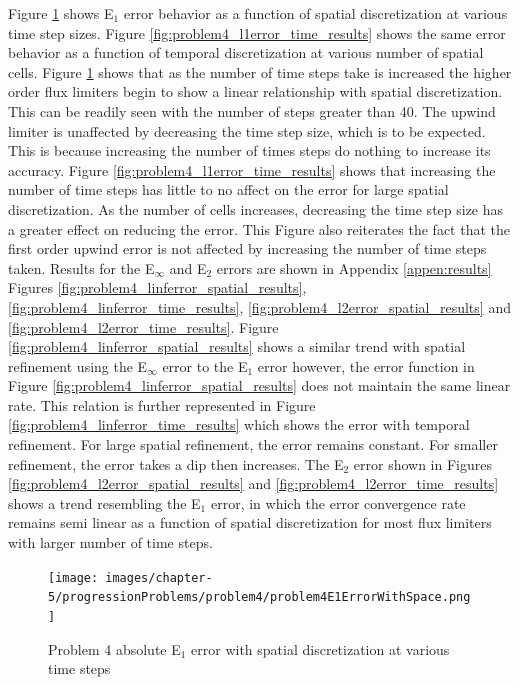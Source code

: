 Figure \ref{fig:problem4_l1error_spatial_results} shows E${}_{1}$ error behavior as a function of spatial discretization at various time step sizes. Figure \ref{fig:problem4_l1error_time_results} shows the same error behavior as a function of temporal discretization at various number of spatial cells. Figure \ref{fig:problem4_l1error_spatial_results} shows that as the number of time steps take is increased the higher order flux limiters begin to show a linear relationship with spatial discretization. This can be readily seen with the number of steps greater than 40. The upwind limiter is unaffected by decreasing the time step size, which is to be expected. This is because increasing the number of times steps do nothing to increase its accuracy. Figure \ref{fig:problem4_l1error_time_results} shows that increasing the number of time steps has little to no affect on the error for large spatial discretization. As the number of cells increases, decreasing the time step size has a greater effect on reducing the error. This Figure also reiterates the fact that the first order upwind error is not affected by increasing the number of time steps taken. Results for the E${}_{\infty}$ and E${}_{2}$ errors are shown in Appendix \ref{appen:results} Figures \ref{fig:problem4_linferror_spatial_results}, \ref{fig:problem4_linferror_time_results}, \ref{fig:problem4_l2error_spatial_results} and \ref{fig:problem4_l2error_time_results}. Figure \ref{fig:problem4_linferror_spatial_results} shows a similar trend with spatial refinement using the E${}_{\infty}$ error to the E${}_{1}$ error however, the error function in Figure \ref{fig:problem4_linferror_spatial_results} does not maintain the same linear rate. This relation is further represented in Figure \ref{fig:problem4_linferror_time_results} which shows the error with temporal refinement. For large spatial refinement, the error remains constant. For smaller refinement, the error takes a dip then increases. The E${}_{2}$ error shown in Figures \ref{fig:problem4_l2error_spatial_results} and \ref{fig:problem4_l2error_time_results} shows a trend resembling the E${}_{1}$ error, in which the error convergence rate remains semi linear as a function of spatial discretization for most flux limiters with larger number of time steps. 

\clearpage

\begin{figure}[p]
    \centering
    \texttt{[image: images/chapter-5/progressionProblems/problem4/problem4E1ErrorWithSpace.png]}
    \caption{Problem 4 absolute E${}_{1}$ error with spatial discretization at various time steps }
    \label{fig:problem4_l1error_spatial_results}
\end{figure}

